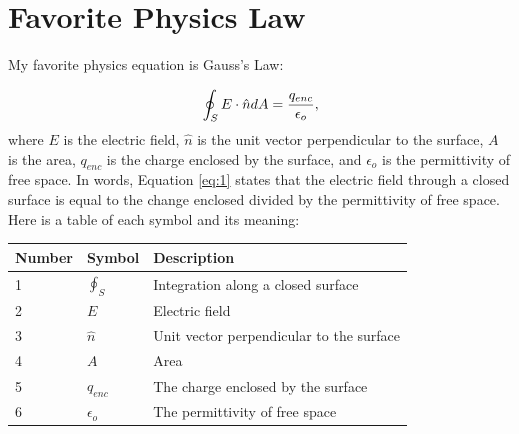 \documentclass[12pt, letterpaper]{article} %
\begin{document}
\section{Favorite Physics Law} %
My favorite physics equation is Gauss's Law:

    \begin{equation}  %
       \label{eq:1}  %
        \\ %
        \oint_S E\cdot \hat{n} dA=\frac{q_{enc}}{\epsilon_o},
    \end{equation} %
where $E$ is the electric field, $\hat{n}$ is the unit vector perpendicular to the surface, $A$ is the area, $q_{enc}$ is the charge enclosed by the surface, and $\epsilon_o$ is the permittivity of free space. %
In words, Equation \ref{eq:1} %
states that the electric field through a closed surface is equal to the change enclosed divided by the permittivity of free space. 
Here is a table of each symbol and its meaning:

\begin{table}[ht] %
    \begin{center} %
      \begin{tabular}{l|l|l}  %
        \hline %
        Number & Symbol & Description\\  %
        \hline\hline  %
        1 & $\oint_S$ & Integration along a closed surface\\ 
        2 & $E$ & Electric field\\ 
        3 & $\hat{n}$ & Unit vector perpendicular to the surface\\ 
        4 & $A$ & Area\\
        5 & $q_{enc}$ & The charge enclosed by the surface\\
        6 & $\epsilon_o$ & The permittivity of free space
     \end{tabular} %
     \label{tab:1} %
    \end{center} %
\end{table} %
\end{document}
